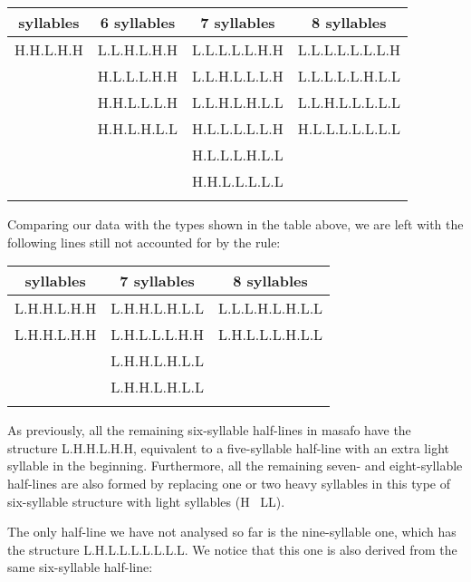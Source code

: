 \begin{refsection}
\begin{mysolution}
\begin{table}[H]
    \begin{tabular}{cccc}
    \lsptoprule
    5 syllables & 6 syllables & 7 syllables & 8 syllables\\
    \midrule
    H.H.L.H.H & L.L.H.L.H.H & L.L.L.L.L.H.H & L.L.L.L.L.L.L.H\\ 
              & H.L.L.L.H.H & L.L.H.L.L.L.H & L.L.L.L.L.H.L.L\\ 
              & H.H.L.L.L.H & L.L.H.L.H.L.L & L.L.H.L.L.L.L.L\\ 
              & H.H.L.H.L.L & H.L.L.L.L.L.H & H.L.L.L.L.L.L.L\\
              &             & H.L.L.L.H.L.L &                \\
              &             & H.H.L.L.L.L.L &                \\
    \lspbottomrule
    \end{tabular}
\end{table}

Comparing our data with the types shown in the table above, we are left with the following lines still not accounted for by the rule:

\begin{table}[H]
    \begin{tabular}{ccc}
    \lsptoprule
    6 syllables & 7 syllables & 8 syllables\\
    \midrule
    L.H.H.L.H.H & L.H.H.L.H.L.L & L.L.L.H.L.H.L.L\\
    L.H.H.L.H.H & L.H.L.L.L.H.H & L.H.L.L.L.H.L.L\\
                & L.H.H.L.H.L.L &                \\
                & L.H.H.L.H.L.L &                \\
    \lspbottomrule
    \end{tabular}
\end{table}

As previously, all the remaining six-syllable half-lines in masafo have the structure L.H.H.L.H.H, equivalent to a five-syllable half-line with an extra light syllable in the beginning. Furthermore, all the remaining seven- and eight-syllable half-lines are also formed by replacing one or two heavy syllables in this type of six-syllable structure with light syllables (H \textrightarrow\ LL).

The only half-line we have not analysed so far is the nine-syllable one, which has the structure L.H.L.L.L.L.L.L.L. We notice that this one is also derived from the same six-syllable half-line: 


\end{mysolution}
\end{refsection}
